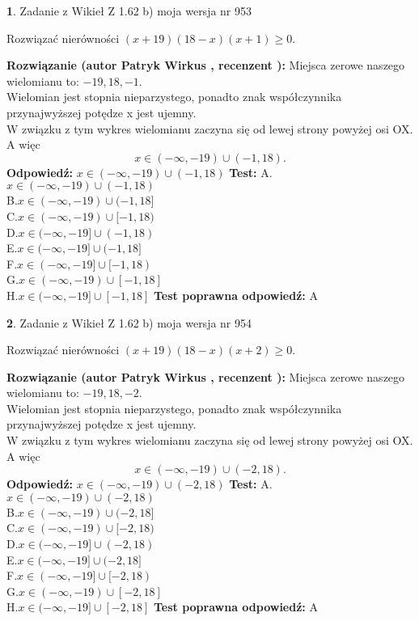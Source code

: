 \documentclass[12pt, a4paper]{article}
\theoremstyle{definition} %
\newtheorem{zad}{}
\newcommand{\zadStart}[1]{\begin{zad}#1\newline}
\newcommand{\zadStop}{\end{zad}}
\newcommand{\rozwStart}[2]{\noindent \textbf{Rozwiązanie (autor #1 , recenzent #2): }\newline}
\newcommand{\rozwStop}{\newline}
\newcommand{\odpStart}{\noindent \textbf{Odpowiedź:}\newline}
\newcommand{\odpStop}{\newline}
\newcommand{\testStart}{\noindent \textbf{Test:}\newline}
\newcommand{\testStop}{\newline}
\newcommand{\kluczStart}{\noindent \textbf{Test poprawna odpowiedź:}\newline}
\newcommand{\kluczStop}{\newline}
\begin{document}
\zadStart{Zadanie z Wikieł Z 1.62 b) moja wersja nr 953}

Rozwiązać nierówności $(x+19)(18-x)(x+1)\ge0$.
\zadStop
\rozwStart{Patryk Wirkus}{}
Miejsca zerowe naszego wielomianu to: $-19, 18, -1$.\\
Wielomian jest stopnia nieparzystego, ponadto znak współczynnika przy\linebreak najwyższej potędze x jest ujemny.\\ W związku z tym wykres wielomianu zaczyna się od lewej strony powyżej osi OX. A więc $$x \in (-\infty,-19) \cup (-1,18).$$
\rozwStop
\odpStart
$x \in (-\infty,-19) \cup (-1,18)$
\odpStop
\testStart
A.$x \in (-\infty,-19) \cup (-1,18)$\\
B.$x \in (-\infty,-19) \cup (-1,18]$\\
C.$x \in (-\infty,-19) \cup [-1,18)$\\
D.$x \in (-\infty,-19] \cup (-1,18)$\\
E.$x \in (-\infty,-19] \cup (-1,18]$\\
F.$x \in (-\infty,-19] \cup [-1,18)$\\
G.$x \in (-\infty,-19) \cup [-1,18]$\\
H.$x \in (-\infty,-19] \cup [-1,18]$
\testStop
\kluczStart
A
\kluczStop



\zadStart{Zadanie z Wikieł Z 1.62 b) moja wersja nr 954}

Rozwiązać nierówności $(x+19)(18-x)(x+2)\ge0$.
\zadStop
\rozwStart{Patryk Wirkus}{}
Miejsca zerowe naszego wielomianu to: $-19, 18, -2$.\\
Wielomian jest stopnia nieparzystego, ponadto znak współczynnika przy\linebreak najwyższej potędze x jest ujemny.\\ W związku z tym wykres wielomianu zaczyna się od lewej strony powyżej osi OX. A więc $$x \in (-\infty,-19) \cup (-2,18).$$
\rozwStop
\odpStart
$x \in (-\infty,-19) \cup (-2,18)$
\odpStop
\testStart
A.$x \in (-\infty,-19) \cup (-2,18)$\\
B.$x \in (-\infty,-19) \cup (-2,18]$\\
C.$x \in (-\infty,-19) \cup [-2,18)$\\
D.$x \in (-\infty,-19] \cup (-2,18)$\\
E.$x \in (-\infty,-19] \cup (-2,18]$\\
F.$x \in (-\infty,-19] \cup [-2,18)$\\
G.$x \in (-\infty,-19) \cup [-2,18]$\\
H.$x \in (-\infty,-19] \cup [-2,18]$
\testStop
\kluczStart
A
\kluczStop
\end{document}

